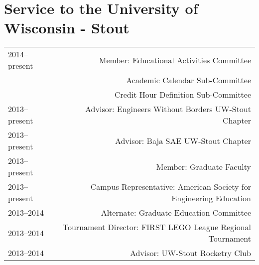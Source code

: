 \section*{Service to the University of Wisconsin - Stout}
\begin{tabular}{L!{\VRule}R}
2014--present&Member: Educational Activities Committee \\
 &Academic Calendar Sub-Committee \\
 &Credit Hour Definition Sub-Committee \\
2013--present&Advisor: Engineers Without Borders UW-Stout Chapter \\
2013--present&Advisor: Baja SAE UW-Stout Chapter \\
2013--present&Member: Graduate Faculty \\
2013--present&Campus Representative: American Society for Engineering Education\\
2013--2014&Alternate: Graduate Education Committee \\
2013--2014&Tournament Director: FIRST LEGO League Regional Tournament\\
2013--2014&Advisor: UW-Stout Rocketry Club\\
\end{tabular}
